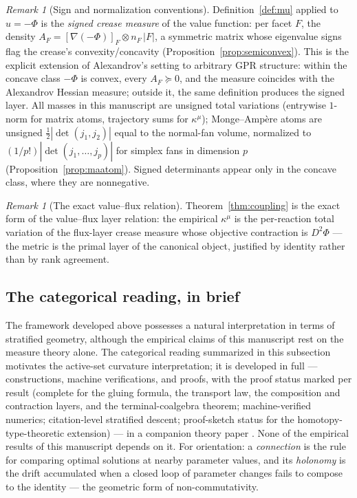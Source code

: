 \documentclass[11pt,a4paper]{article}
\theoremstyle{plain}
\theoremstyle{definition}
\theoremstyle{remark}
\newtheorem{remark}[theorem]{Remark}
\newcommand{\kmu}{\kappa^{\mu}}
\begin{document}
\begin{remark}[Sign and normalization conventions]\label{rem:conventions}
Definition~\ref{def:mu} applied to $u = -\Phi$ is the \emph{signed
crease measure} of the value function: per facet $F$, the density
$A_F = [\nabla(-\Phi)]_F \otimes n_F\,|F|$, a symmetric matrix whose
eigenvalue signs flag the crease's convexity/concavity
(Proposition~\ref{prop:semiconvex}). This is the explicit extension
of Alexandrov's setting to arbitrary GPR structure: within the
concave class $-\Phi$ is convex, every $A_F \succeq 0$, and the
measure coincides with the Alexandrov Hessian measure; outside it,
the same definition produces the signed layer. All masses in this
manuscript are unsigned total variations (entrywise $1$-norm for
matrix atoms, trajectory sums for $\kmu$); Monge--Amp\`ere atoms are
unsigned $\tfrac12|\det(j_1, j_2)|$ equal to the normal-fan volume,
normalized to $(1/p!)|\det(j_1,\dots,j_p)|$ for simplex fans in
dimension $p$ (Proposition~\ref{prop:maatom}). Signed determinants
appear only in the concave class, where they are nonnegative.
\end{remark}

\begin{remark}[The exact value--flux relation]\label{rem:closes}
Theorem~\ref{thm:coupling} is the exact form of the value--flux layer relation: the empirical $\kmu$ is the
per-reaction total variation of the flux-layer crease measure whose
objective contraction is $D^2\Phi$ --- the metric is the primal
layer of the canonical object, justified by identity rather than by
rank agreement.
\end{remark}

\subsection{The categorical reading, in brief}\label{sec:categorical}

The framework developed above possesses a natural interpretation in
terms of stratified geometry, although the empirical claims of this
manuscript rest on the measure theory alone. The categorical reading
summarized in this subsection motivates the active-set curvature
interpretation; it is developed in full ---
constructions, machine verifications, and proofs, with the proof
status marked per result (complete for the gluing formula, the
transport law, the composition and contraction layers, and the
terminal-coalgebra theorem; machine-verified numerics;
citation-level stratified descent; proof-sketch status for the
homotopy-type-theoretic extension) --- in a companion theory paper
\citep{zai2026categorical}. None of the empirical results of this
manuscript depends on it. For orientation: a \emph{connection} is
the rule for comparing optimal solutions at nearby parameter values,
and its \emph{holonomy} is the drift accumulated when a closed loop of
parameter changes fails to compose to the identity --- the geometric
form of non-commutativity.
\end{document}

